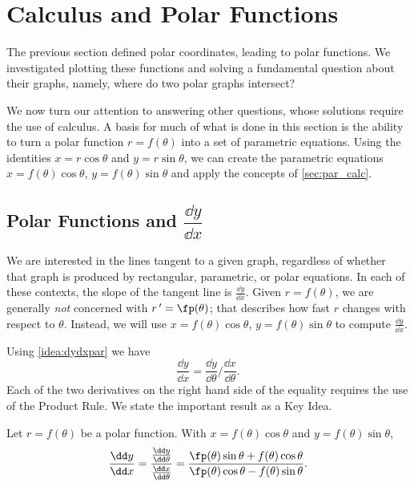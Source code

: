 \section{Calculus and Polar Functions} \label{sec:polarcalc}

The previous section defined polar coordinates, leading to polar functions. We investigated plotting these functions and solving a fundamental question about their graphs, namely, where do two polar graphs intersect?

We now turn our attention to answering other questions, whose solutions require the use of calculus. A basis for much of what is done in this section is the ability to turn a polar function $r=f(\theta)$ into a set of parametric equations. Using the identities $x=r\cos \theta$ and $y=r\sin \theta$, we can create the parametric equations $x=f(\theta)\cos\theta$, $y=f(\theta)\sin\theta$ and apply the concepts of \autoref{sec:par_calc}.

\subsection{Polar Functions and \texorpdfstring{$\dfrac{\dd y}{\dd x}$}{dy/dx}}

We are interested in the lines tangent to a given graph, regardless of whether that graph is produced by rectangular, parametric, or polar equations. In each of these contexts, the slope of the tangent line is $\frac{\dd y}{\dd x}$. Given $r=f(\theta)$, we are generally \emph{not} concerned with $r\,'=\fp(\theta)$; that describes how fast $r$ changes with respect to $\theta$. Instead, we will use $x=f(\theta)\cos\theta$, $y=f(\theta)\sin\theta$ to compute $\frac{\dd y}{\dd x}$. 

Using \autoref{idea:dydxpar} we have
\[\frac{\dd y}{\dd x} = \frac{\dd y}{\dd\theta}\Big/\frac{\dd x}{\dd\theta}.\]
Each of the two derivatives on the right hand side of the equality requires the use of the Product Rule. We state the important result as a Key Idea.

\begin{keyidea}\label{idea:dydxpol}%
Let $r=f(\theta)$ be a polar function. With $x=f(\theta)\cos\theta$ and $y=f(\theta)\sin\theta$,
\[
 \frac{\dd y}{\dd x}
 =\frac{\frac{\dd y}{\dd\theta}}{\frac{\dd x}{\dd\theta}}
 =\frac{\fp(\theta)\sin\theta+f(\theta)\cos\theta}{\fp(\theta)\cos\theta-f(\theta)\sin\theta}.
\]
\end{keyidea}


